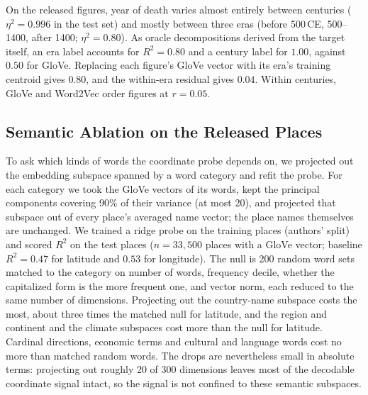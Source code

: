 \documentclass[11pt]{article}
\begin{document}
On the released figures, year of death varies almost entirely between centuries
($\eta^2 = 0.996$ in the test set) and mostly between three eras (before 500\,CE,
500--1400, after 1400; $\eta^2 = 0.80$). As oracle decompositions derived from the target itself, an
era label accounts for $R^2 = 0.80$ and a century label for $1.00$, against $0.50$ for GloVe. Replacing each figure's GloVe vector
with its era's training centroid gives $0.80$, and the within-era residual gives $0.04$.
Within centuries, GloVe and Word2Vec order figures at $r = 0.05$.

\subsection{Semantic Ablation on the Released Places}
\label{sec:semantic_ablation}

To ask which kinds of words the coordinate probe depends on, we projected out the embedding subspace spanned by a word category and refit the probe. For each category we took the GloVe vectors of its words, kept the principal components covering 90\% of their variance (at most 20), and projected that subspace out of every place's averaged name vector; the place names themselves are unchanged. We trained a ridge probe on the training places (authors' split) and scored $R^2$ on the test places ($n = 33{,}500$ places with a GloVe vector; baseline $R^2 = 0.47$ for latitude and $0.53$ for longitude). The null is 200 random word sets matched to the category on number of words, frequency decile, whether the capitalized form is the more frequent one, and vector norm, each reduced to the same number of dimensions. Projecting out the country-name subspace costs the most, about three times the matched null for latitude, and the region and continent and the climate subspaces cost more than the null for latitude. Cardinal directions, economic terms and cultural and language words cost no more than matched random words. The drops are nevertheless small in absolute terms: projecting out roughly 20 of 300 dimensions leaves most of the decodable coordinate signal intact, so the signal is not confined to these semantic subspaces.
\end{document}
